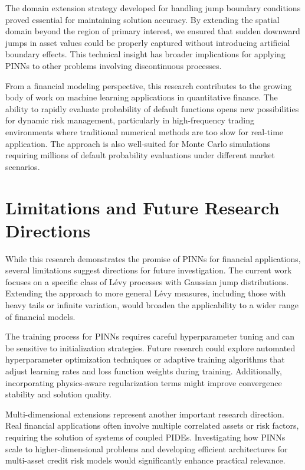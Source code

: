 \documentclass[11pt,twoside,openright]{report}
\begin{document}
The domain extension strategy developed for handling jump boundary conditions proved essential for maintaining solution accuracy. By extending the spatial domain beyond the region of primary interest, we ensured that sudden downward jumps in asset values could be properly captured without introducing artificial boundary effects. This technical insight has broader implications for applying PINNs to other problems involving discontinuous processes.

From a financial modeling perspective, this research contributes to the growing body of work on machine learning applications in quantitative finance. The ability to rapidly evaluate probability of default functions opens new possibilities for dynamic risk management, particularly in high-frequency trading environments where traditional numerical methods are too slow for real-time application. The approach is also well-suited for Monte Carlo simulations requiring millions of default probability evaluations under different market scenarios.

\section{Limitations and Future Research Directions}

While this research demonstrates the promise of PINNs for financial applications, several limitations suggest directions for future investigation. The current work focuses on a specific class of Lévy processes with Gaussian jump distributions. Extending the approach to more general Lévy measures, including those with heavy tails or infinite variation, would broaden the applicability to a wider range of financial models.

The training process for PINNs requires careful hyperparameter tuning and can be sensitive to initialization strategies. Future research could explore automated hyperparameter optimization techniques or adaptive training algorithms that adjust learning rates and loss function weights during training. Additionally, incorporating physics-aware regularization terms might improve convergence stability and solution quality.

Multi-dimensional extensions represent another important research direction. Real financial applications often involve multiple correlated assets or risk factors, requiring the solution of systems of coupled PIDEs. Investigating how PINNs scale to higher-dimensional problems and developing efficient architectures for multi-asset credit risk models would significantly enhance practical relevance.
\end{document}
